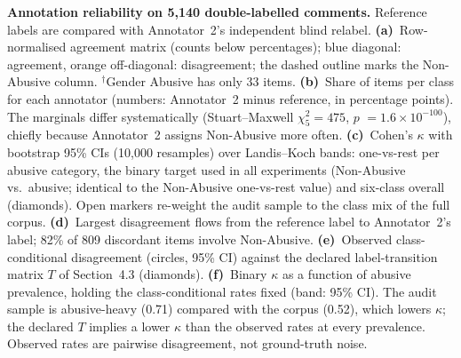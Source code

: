 \caption{\textbf{Annotation reliability on 5,140 double-labelled comments.} Reference labels are compared with Annotator~2's independent blind relabel. \textbf{(a)}~Row-normalised agreement matrix (counts below percentages); blue diagonal: agreement, orange off-diagonal: disagreement; the dashed outline marks the Non-Abusive column. $^\dagger$Gender Abusive has only 33 items. \textbf{(b)}~Share of items per class for each annotator (numbers: Annotator~2 minus reference, in percentage points). The marginals differ systematically (Stuart--Maxwell $\chi^2_{5}=475$, $p$ $= 1.6\times10^{-100}$), chiefly because Annotator~2 assigns Non-Abusive more often. \textbf{(c)}~Cohen's $\kappa$ with bootstrap 95\% CIs (10,000 resamples) over Landis--Koch bands: one-vs-rest per abusive category, the binary target used in all experiments (Non-Abusive vs.\ abusive; identical to the Non-Abusive one-vs-rest value) and six-class overall (diamonds). Open markers re-weight the audit sample to the class mix of the full corpus. \textbf{(d)}~Largest disagreement flows from the reference label to Annotator~2's label; 82\% of 809 discordant items involve Non-Abusive. \textbf{(e)}~Observed class-conditional disagreement (circles, 95\% CI) against the declared label-transition matrix $T$ of Section~4.3 (diamonds). \textbf{(f)}~Binary $\kappa$ as a function of abusive prevalence, holding the class-conditional rates fixed (band: 95\% CI). The audit sample is abusive-heavy (0.71) compared with the corpus (0.52), which lowers $\kappa$; the declared $T$ implies a lower $\kappa$ than the observed rates at every prevalence. Observed rates are pairwise disagreement, not ground-truth noise.}
